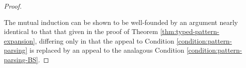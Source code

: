 \begin{proof}
\begin{enumerate}
  \end{enumerate}
The mutual induction can be shown to be well-founded by an argument nearly identical to that that given in the proof of Theorem \ref{thm:typed-pattern-expansion}, differing only in that the appeal to Condition \ref{condition:pattern-parsing} is replaced by an appeal to the analagous Condition \ref{condition:pattern-parsing-BS}.


\end{proof}
